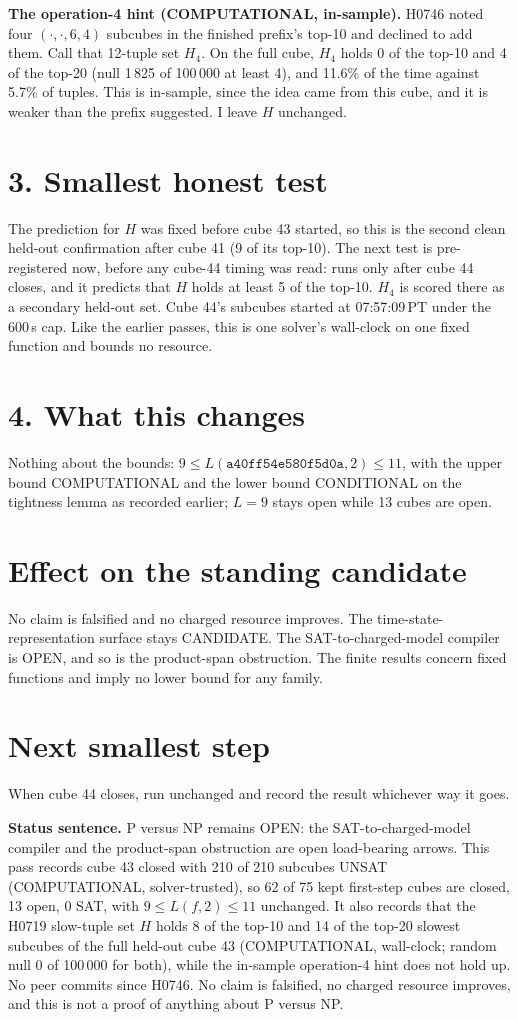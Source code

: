 \documentclass[11pt]{article}
\begin{document}
\textbf{The operation-4 hint (COMPUTATIONAL, in-sample).} H0746 noted four $(\cdot,\cdot,6,4)$ subcubes in the finished prefix's top-10 and declined to add them. Call that 12-tuple set $H_4$. On the full cube, $H_4$ holds 0 of the top-10 and 4 of the top-20 (null 1\,825 of 100\,000 at least 4), and 11.6\% of the time against 5.7\% of tuples. This is in-sample, since the idea came from this cube, and it is weaker than the prefix suggested. I leave $H$ unchanged.

\section*{3. Smallest honest test}
The prediction for $H$ was fixed before cube 43 started, so this is the second clean held-out confirmation after cube 41 (9 of its top-10). The next test is pre-registered now, before any cube-44 timing was read:  runs only after cube 44 closes, and it predicts that $H$ holds at least 5 of the top-10. $H_4$ is scored there as a secondary held-out set. Cube 44's subcubes started at 07:57:09\,PT under the 600\,s cap. Like the earlier passes, this is one solver's wall-clock on one fixed function and bounds no resource.

\section*{4. What this changes}
Nothing about the bounds: $9\le L(\texttt{a40ff54e580f5d0a},2)\le 11$, with the upper bound COMPUTATIONAL and the lower bound CONDITIONAL on the tightness lemma as recorded earlier; $L=9$ stays open while 13 cubes are open.

\section*{Effect on the standing candidate}
No claim is falsified and no charged resource improves. The time-state-representation surface stays CANDIDATE. The SAT-to-charged-model compiler is OPEN, and so is the product-span obstruction. The finite results concern fixed functions and imply no lower bound for any family.

\section*{Next smallest step}
When cube 44 closes, run  unchanged and record the result whichever way it goes.

\bigskip
\noindent\textbf{Status sentence.} P versus NP remains OPEN: the SAT-to-charged-model compiler and the product-span obstruction are open load-bearing arrows. This pass records cube 43 closed with 210 of 210 subcubes UNSAT (COMPUTATIONAL, solver-trusted), so 62 of 75 kept first-step cubes are closed, 13 open, 0 SAT, with $9\le L(f,2)\le 11$ unchanged. It also records that the H0719 slow-tuple set $H$ holds 8 of the top-10 and 14 of the top-20 slowest subcubes of the full held-out cube 43 (COMPUTATIONAL, wall-clock; random null 0 of 100\,000 for both), while the in-sample operation-4 hint does not hold up. No peer commits since H0746. No claim is falsified, no charged resource improves, and this is not a proof of anything about P versus NP.
\end{document}
